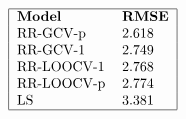 \documentclass[10pt]{article}
\begin{document}
\begin{align*}\begin{tabular}{ |ll| } 
\hline
\textbf{Model} &  \textbf{RMSE} \\ 
RR-GCV-p &  2.618 \\ 
RR-GCV-1 &  2.749 \\
RR-LOOCV-1 & 2.768 \\
RR-LOOCV-p & 2.774 \\
LS & 3.381 \\
\hline
\end{tabular}\end{align*}
\end{document}
